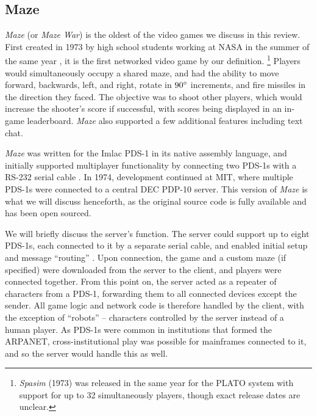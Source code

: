 \label{subsec:maze}

\subsection{Maze}

\textit{Maze} (or \textit{Maze War}) is the oldest of the video games we discuss in this review. First created in 1973 by high school students working at NASA in the summer of the same year \cite{thompson}, it is the first networked video game by our definition.
\footnote{\textit{Spasim} (1973) was released in the same year for the PLATO system with support for up to 32 simultaneously players, though exact release dates are unclear.}
Players would simultaneously occupy a shared maze, and had the ability to move forward, backwards, left, and right, rotate in $90\degree$ increments, and fire missiles in the direction they faced. The objective was to shoot other players, which would increase the shooter's score if successful, with scores being displayed in an in-game leaderboard. \textit{Maze} also supported a few additional features including text chat.

\textit{Maze} was written for the Imlac PDS-1 in its native assembly language, and initially supported multiplayer functionality by connecting two PDS-1s with a RS-232 serial cable \cite{thompson}. In 1974, development continued at MIT, where multiple PDS-1s were connected to a central DEC PDP-10 server. This version of \textit{Maze} is what we will discuss henceforth, as the original source code is fully available and has been open sourced.

% 

We will briefly discuss the server's function. The server could support up to eight PDS-1s, each connected to it by a separate serial cable, and enabled initial setup and message ``routing'' \cite{thompson}. Upon connection, the game and a custom maze (if specified) were downloaded from the server to the client, and players were connected together. From this point on, the server acted as a repeater of characters from a PDS-1, forwarding them to all connected devices except the sender. All game logic and network code is therefore handled by the client, with the exception of ``robots'' -- characters controlled by the server instead of a human player.
As PDS-1s were common in institutions that formed the ARPANET, cross-institutional play was possible for mainframes connected to it, and so the server would handle this as well.

% 

